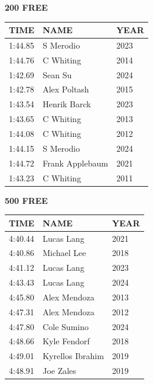 \begin{table}[H]
\centering
\begin{minipage}[t]{0.48\textwidth}
\centering
\textbf{200 FREE}\\[0.1cm]
\begin{tabular}{@{}p{1.8cm}p{2.8cm}p{1.2cm}@{}}
\hline
    \textbf{TIME} & \textbf{NAME} & \textbf{YEAR} \\
\hline
    1:44.85 & S Merodio & 2023 \\
    1:44.76 & C Whiting & 2014 \\
    1:42.69 & Sean Su & 2024 \\
    1:42.78 & Alex Poltash & 2015 \\
    1:43.54 & Henrik Barck & 2023 \\
    1:43.65 & C Whiting & 2013 \\
    1:44.08 & C Whiting & 2012 \\
    1:44.15 & S Merodio & 2024 \\
    1:44.72 & Frank Applebaum & 2021 \\
    1:43.23 & C Whiting & 2011 \\
\hline
\end{tabular}
\end{minipage}\hfill
\begin{minipage}[t]{0.48\textwidth}
\centering
\textbf{500 FREE}\\[0.1cm]
\begin{tabular}{@{}p{1.8cm}p{2.8cm}p{1.2cm}@{}}
\hline
    \textbf{TIME} & \textbf{NAME} & \textbf{YEAR} \\
\hline
    4:40.44 & Lucas Lang & 2021 \\
    4:40.86 & Michael Lee & 2018 \\
    4:41.12 & Lucas Lang & 2023 \\
    4:43.43 & Lucas Lang & 2024 \\
    4:45.80 & Alex Mendoza & 2013 \\
    4:47.31 & Alex Mendoza & 2012 \\
    4:47.80 & Cole Sumino & 2024 \\
    4:48.66 & Kyle Fendorf & 2018 \\
    4:49.01 & Kyrellos Ibrahim & 2019 \\
    4:48.91 & Joe Zales & 2019 \\
\hline
\end{tabular}
\end{minipage}
\end{table}

